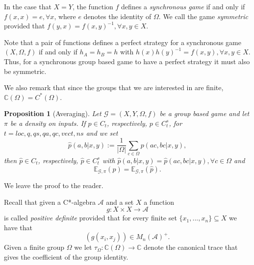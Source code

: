 \documentclass[11pt]{amsart}
\newtheorem{prop}[thm]{Proposition}
\theoremstyle{definition}
\newcommand{\bb}[1]{\mathbb{#1}}
\newcommand{\cl}[1]{\mathcal{#1}}
\begin{document}
 In the case that $X=Y$, the function $f$ defines a {\it synchronous game} if and only if
 $f(x,x) =e, \forall x$, where $e$ denotes the identity of $\Omega$. We call the game {\it symmetric} provided that $f(y,x) = f(x,y)^{-1}, \forall x,y \in X$.

 Note that a pair of functions defines a perfect strategy for a synchronous game $(X,\Omega,f)$ if and only if $h_A = h_B =h$ with $h(x) h(y)^{-1} = f(x,y), \forall x,y \in X$. Thus, for a synchronous group based game to have a perfect strategy it must also be symmetric.

We also remark that since the groups that we are interested in are finite, $\bb C(\Omega) = C^*(\Omega)$.

\begin{prop}[Averaging]\label{averaging} Let $\cl G=(X, Y, \Omega, f)$ be a group based game and let $\pi$ be a density on inputs.  If $p \in C_t$, respectively, $p \in C^s_t$, for $t=loc, q, qs,qa,qc, vect, ns$ and we set
\[ \hat{p}(a, b | x, y) := \frac{1}{|\Omega|} \sum_{c \in \Omega} p(ac, bc | x, y),\]
then $\hat{p} \in C_t$, respectively, $\hat{p} \in C^s_t$ with $\hat{p}(a,b|x,y) = \hat{p}(ac,bc|x,y), \forall c\in \Omega$ and
\[ \bb E_{\cl G, \pi}(p) = \bb E_{\cl G, \pi}(\hat{p}).\]
\end{prop}

We leave the proof to the reader.

Recall that given a C*-algebra $\cl A$ and a set $X$ a function
\[ g: X \times X \to \cl A\]
is called {\it positive definite} provided that for every finite set $\{ x_1,...,x_n \} \subseteq X$ we have that
\[ (g(x_i, x_j)) \in M_n(\cl A)^+.\]
Given a finite group $\Omega$ we let $\tau_{\Omega}: \bb C(\Omega) \to \bb C$ denote the canonical trace that gives the coefficient of the group identity.
\end{document}
